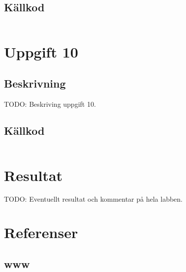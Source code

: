 \documentclass[11pt,a4paper]{article}
\begin{document}
\subsection{Källkod}\label{uppgift-9_src}
\inputminted[]{java}{../src/Lab1Uppg09.java}

\section{Uppgift 10}\label{uppgift-10}

\subsection{Beskrivning}
TODO: Beskriving uppgift 10.

\subsection{Källkod}\label{uppgift-10_src}
\inputminted[]{java}{../src/Lab1Uppg10.java}


\section{Resultat}\label{setup}
TODO: Eventuellt resultat och kommentar på hela labben.

\newpage

\section{Referenser}\label{referenser}

\subsection{www}\label{}
\end{document}
